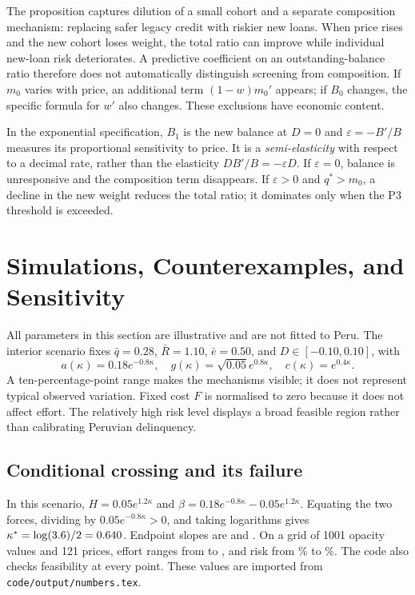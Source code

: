\documentclass[11pt]{article}
\theoremstyle{definition}\newtheorem{assumption}{Assumption}
\begin{document}
The proposition captures dilution of a small cohort and a separate
composition mechanism: replacing safer legacy credit with riskier new loans.
When price rises and the new cohort loses weight, the total ratio can improve
while individual new-loan risk deteriorates. A predictive coefficient on an
outstanding-balance ratio therefore does not automatically distinguish
screening from composition. If $m_0$ varies with price, an additional term
$(1-w)m_0'$ appears; if $B_0$ changes, the specific formula for $w'$ also
changes. These exclusions have economic content.

In the exponential specification, $B_1$ is the new balance at $D=0$ and
$\varepsilon=-B'/B$ measures its proportional sensitivity to price. It is
a \emph{semi-elasticity} with respect to a decimal rate, rather than the
elasticity $DB'/B=-\varepsilon D$. If $\varepsilon=0$, balance is
unresponsive and the composition term disappears. If $\varepsilon>0$ and
$q^*>m_0$, a decline in the new weight reduces the total ratio; it dominates
only when the P3 threshold is exceeded.

\section{Simulations, Counterexamples, and Sensitivity}\label{sec:sim}
All parameters in this section are illustrative and are not fitted to Peru.
The interior scenario fixes $\bar q=0.28$, $\bar R=1.10$, $\bar e=0.50$,
and $D\in[-0.10,0.10]$, with
\[
a(\kappa)=0.18e^{-0.8\kappa},\quad
g(\kappa)=\sqrt{0.05}e^{0.8\kappa},\quad c(\kappa)=e^{0.4\kappa}.
\]
A ten-percentage-point range makes the mechanisms visible; it does not
represent typical observed variation. Fixed cost $F$ is normalised to zero
because it does not affect effort. The relatively high risk level displays
a broad feasible region rather than calibrating Peruvian delinquency.

\subsection{Conditional crossing and its failure}
In this scenario, $H=0.05e^{1.2\kappa}$ and
$\beta=0.18e^{-0.8\kappa}-0.05e^{1.2\kappa}$. Equating the two forces,
dividing by $0.05e^{-0.8\kappa}>0$, and taking logarithms gives
$\kappa^*=\log(3.6)/2=0.640$. Endpoint slopes are \betaZero{} and
\betaOne{}. On a grid of 1001 opacity values and 121 prices, effort ranges
from \effortMin{} to \effortMax{}, and risk from \riskMin\% to \riskMax\%.
The code also checks feasibility at every point. These values are imported
from \texttt{code/output/numbers.tex}.
\end{document}
